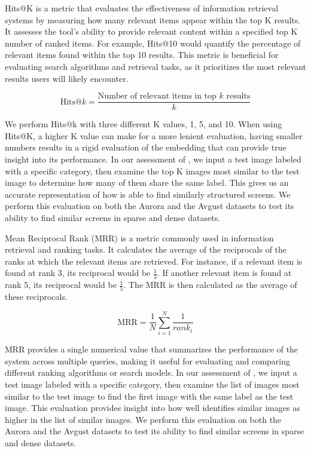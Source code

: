 
Hits@K is a metric that evaluates the effectiveness of information retrieval systems by measuring how many relevant items appear within the top K results. It assesses the tool's ability to provide relevant content within a specified top K number of ranked items. For example, Hits@10 would quantify the percentage of relevant items found within the top 10 results. This metric is beneficial for evaluating search algorithms and retrieval tasks, as it prioritizes the most relevant results users will likely encounter. 

\begin{equation}
\text{Hits@}k = \frac{\text{Number of relevant items in top }k\text{ results}}{k}
\end{equation}

We perform Hits@k with three different K values, 1, 5, and 10. When using Hits@K, a higher K value can make for a more lenient evaluation, having smaller numbers results in a rigid evaluation of the embedding that can provide true insight into its performance. In our assessment of \FRAME, we input a test image labeled with a specific category, then examine the top K images most similar to the test image to determine how many of them share the same label. This gives us an accurate representation of how \FRAME is able to find similarly structured screens. We perform this evaluation on both the Aurora and the Avgust datasets to test its ability to find similar screens in sparse and dense datasets. 


Mean Reciprocal Rank (MRR) is a metric commonly used in information retrieval and ranking tasks. It calculates the average of the reciprocals of the ranks at which the relevant items are retrieved. For instance, if a relevant item is found at rank 3, its reciprocal would be \( \frac{1}{3} \). If another relevant item is found at rank 5, its reciprocal would be \( \frac{1}{5} \). The MRR is then calculated as the average of these reciprocals. 

\begin{equation}
\text{MRR} = \frac{1}{N} \sum_{i=1}^{N} \frac{1}{rank_i}
\end{equation}

MRR provides a single numerical value that summarizes the performance of the system across multiple queries, making it useful for evaluating and comparing different ranking algorithms or search models. In our assessment of \FRAME, we input a test image labeled with a specific category, then examine the list of images most similar to the test image to find the first image with the same label as the test image. This evaluation provides insight into how well \FRAME identifies similar images as higher in the list of similar images. We perform this evaluation on both the Aurora and the Avgust datasets to test its ability to find similar screens in sparse and dense datasets. 

